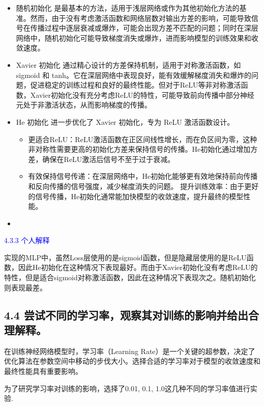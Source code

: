\documentclass[8pt]{article}
\begin{document}
\begin{itemize}
    \item 随机初始化 是最基本的方法，适用于浅层网络或作为其他初始化方法的基准。然而，由于没有考虑激活函数和网络层数对输出方差的影响，可能导致信号在传播过程中逐层衰减或爆炸，可能会出现方差不匹配的问题；同时在深层网络中，随机初始化可能导致梯度消失或爆炸，进而影响模型的训练效果和收敛速度。

    \item Xavier 初始化 通过精心设计的方差保持机制，适用于对称激活函数，如 sigmoid 和 tanh。它在深层网络中表现良好，能有效缓解梯度消失和爆炸的问题，促进稳定的训练过程和良好的最终性能。但对于ReLU等非对称激活函数，Xavier初始化没有充分考虑ReLU的特性，可能导致前向传播中部分神经元处于非激活状态，从而影响梯度的传播。
    
    \item He 初始化 进一步优化了 Xavier 初始化，专为 ReLU 激活函数设计。
    \begin{itemize}
        \item 更适合ReLU：ReLU激活函数在正区间线性增长，而在负区间为零，这种非对称性需要更高的初始化方差来保持信号的传播。He初始化通过增加方差，确保在ReLU激活后信号不至于过于衰减。
        \item 有效保持信号传递：在深层网络中，He初始化能够更有效地保持前向传播和反向传播的信号强度，减少梯度消失的问题。
        提升训练效率：由于更好的信号传播，He初始化通常能加快模型的收敛速度，提升最终的模型性能。
    \end{itemize}
    \item 
\end{itemize}

\textcolor{blue}{4.3.3 个人解释}

实现的MLP中，虽然Loss层使用的是sigmoid函数，但是隐藏层使用的是ReLU函数，因此He初始化在这种情况下表现最好。而由于Xavier初始化没有考虑ReLU的特性，但是适合sigmoid对称激活函数，因此在这种情况下表现次之。随机初始化则表现最差。

\subsection*{4.4 尝试不同的学习率，观察其对训练的影响并给出合理解释。}

在训练神经网络模型时，学习率（Learning Rate）是一个关键的超参数，决定了优化算法在参数空间中移动的步伐大小。选择合适的学习率对于模型的收敛速度和最终性能具有重要影响。

为了研究学习率对训练的影响，选择了0.01, 0.1, 1.0这几种不同的学习率值进行实验.
\end{document}
